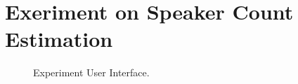 \section{Exeriment on Speaker Count Estimation}

\begin{figure}[htb]
	\centering
	\caption{Experiment User Interface.}
	\label{fig:user_interface}
\end{figure}

